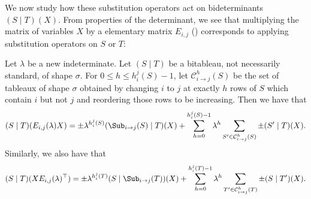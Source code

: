 \documentclass[letterpaper, 11pt]{amsart}
\begin{document}
We now study how these substitution operators act on bideterminants $(S \mid T)(X)$.
From properties of the determinant, we see that multiplying the matrix of variables $X$ by a elementary matrix $E_{i, j}$ () corresponds to applying substitution operators on $S$ or $T$:
\begin{lem}\label{lem:Eij_left_mult}
    Let $\lambda$ be a new indeterminate.
    Let $(S \mid T)$ be a bitableau, not necessarily standard, of shape $\sigma$.
    For $0 \leq h \leq h_{i}^{j}(S) - 1$, let $\mathcal{C}^{h}_{i \to j}(S)$ be the set of tableaux of shape $\sigma$ obtained by changing $i$ to $j$ at exactly $h$ rows of $S$ which contain $i$ but not $j$ and reordering those rows to be increasing.
    Then we have that
    \begin{equation}\label{eq:Eij_left_mult}
        (S \mid T)(E_{i, j}(\lambda)X) = \pm \lambda^{h_{i}^{j}(S)} (\Sub_{i \to j}(S) \mid T)(X) + \sum_{h = 0}^{h_{i}^{j}(S) - 1} \lambda^h \sum_{S' \in \mathcal{C}^{h}_{i \to j}(S)} \pm  (S' \mid T)(X).
    \end{equation}
    Similarly, we also have that
    \begin{equation}\label{eq:Eij_right_mult}
        (S \mid T)(X E_{i, j}(\lambda)^{\top}) = \pm \lambda^{h_{i}^{j}(T)} (S \mid \Sub_{i \to j}(T))(X) + \sum_{h = 0}^{h_{i}^{j}(T) - 1} \lambda^h \sum_{T' \in \mathcal{C}^{h}_{i \to j}(T)} \pm (S \mid T')(X).
    \end{equation}
\end{lem}
\end{document}
